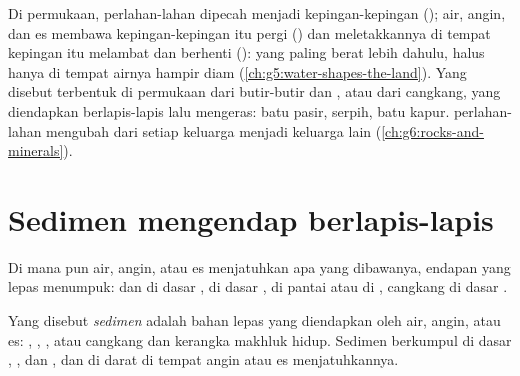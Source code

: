 \begin{recall}
Di permukaan,  perlahan-lahan dipecah menjadi kepingan-kepingan
(\emph{}); air, angin, dan es membawa kepingan-kepingan itu pergi
(\emph{}) dan meletakkannya di tempat kepingan itu melambat dan
berhenti (\emph{}): yang paling berat lebih dahulu,  halus
hanya di tempat airnya hampir diam (\cref{ch:g5:water-shapes-the-land}).
Yang disebut \emph{} terbentuk di permukaan dari butir-butir
 dan , atau dari cangkang, yang diendapkan berlapis-lapis lalu
mengeras: batu pasir, serpih, batu kapur.  perlahan-lahan
mengubah  dari setiap keluarga menjadi  keluarga lain
(\cref{ch:g6:rocks-and-minerals}).
\end{recall}

\section{Sedimen mengendap berlapis-lapis}

Di mana pun air, angin, atau es menjatuhkan apa yang dibawanya, endapan
yang lepas menumpuk:  dan  di dasar ,  di dasar
,  di pantai atau di  , cangkang di dasar .

\begin{definition}[Sedimen]\label{def:g7:sediments-and-fossils:sediment}
Yang disebut \emph{sedimen} adalah bahan lepas yang
diendapkan oleh air, angin, atau es: , , , atau cangkang
dan kerangka makhluk hidup. Sedimen berkumpul di dasar , , dan
, dan di darat di tempat angin atau es menjatuhkannya.
\end{definition}

